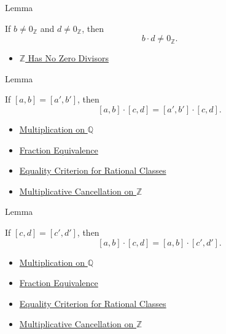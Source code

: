 \begin{lemmabox}{Lemma}
\begin{lemma}
\label{lem:multiplication-denominator-nonzero-q}
If $b\ne 0_{\mathbb{Z}}$ and $d\ne 0_{\mathbb{Z}}$, then
\[
b\cdot d\ne 0_{\mathbb{Z}}.
\]
\end{lemma}
\end{lemmabox}

\begin{dependencies}
\begin{itemize}
  \item \hyperref[thm:z-has-no-zero-divisors]{$\mathbb{Z}$ Has No Zero Divisors}
\end{itemize}
\end{dependencies}

\begin{lemmabox}{Lemma}
\begin{lemma}
\label{lem:multiplication-on-q-respects-left-equivalence}
If $[a,b]=[a',b']$, then
\[
[a,b]\cdot[c,d]=[a',b']\cdot[c,d].
\]
\end{lemma}
\end{lemmabox}

\begin{dependencies}
\begin{itemize}
  \item \hyperref[def:multiplication-on-q-classes]{Multiplication on $\mathbb{Q}$}
  \item \hyperref[def:fraction-equivalence]{Fraction Equivalence}
  \item \hyperref[prop:equality-criterion-for-rational-classes]{Equality Criterion for Rational Classes}
  \item \hyperref[cor:multiplicative-cancellation-on-z]{Multiplicative Cancellation on $\mathbb{Z}$}
\end{itemize}
\end{dependencies}

\begin{lemmabox}{Lemma}
\begin{lemma}
\label{lem:multiplication-on-q-respects-right-equivalence}
If $[c,d]=[c',d']$, then
\[
[a,b]\cdot[c,d]=[a,b]\cdot[c',d'].
\]
\end{lemma}
\end{lemmabox}

\begin{dependencies}
\begin{itemize}
  \item \hyperref[def:multiplication-on-q-classes]{Multiplication on $\mathbb{Q}$}
  \item \hyperref[def:fraction-equivalence]{Fraction Equivalence}
  \item \hyperref[prop:equality-criterion-for-rational-classes]{Equality Criterion for Rational Classes}
  \item \hyperref[cor:multiplicative-cancellation-on-z]{Multiplicative Cancellation on $\mathbb{Z}$}
\end{itemize}
\end{dependencies}


